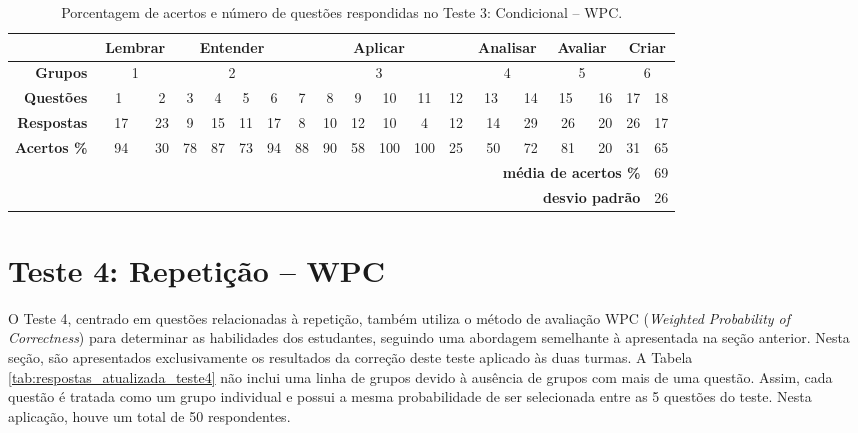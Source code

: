 \begin{table}[!ht]
    \centering
    \caption{Porcentagem de acertos e número de questões respondidas no Teste 3: Condicional -- WPC.}
    \label{tab:respostas_atualizada_teste3}
    \setlength{\tabcolsep}{4.2pt} %
    \begin{tabular}{|r|*{18}{c|}}
        \hline
        \multicolumn{1}{|l|}{} & \multicolumn{2}{c|}{\cellcolor{green!25}\textbf{Lembrar}} & \multicolumn{4}{c|}{\cellcolor{yellow!25}\textbf{Entender}} & \multicolumn{6}{|c|}{\cellcolor{red!25}\textbf{Aplicar}} & \multicolumn{2}{c|}{\cellcolor{blue!25}\textbf{Analisar}} & \multicolumn{2}{c|}{\cellcolor[HTML]{FFE599}\textbf{Avaliar}} & \multicolumn{2}{c|}{\cellcolor[HTML]{D5A6BD}\textbf{Criar}} \\ \hline
        \textbf{Grupos} & \multicolumn{2}{c|}{1} & \multicolumn{4}{c|}{2} & \multicolumn{6}{c|}{3} & \multicolumn{2}{c|}{4} & \multicolumn{2}{c|}{5} & \multicolumn{2}{c|}{6} \\\hline
        \rowcolor[HTML]{D9D9D9} 
        \textbf{Questões} & \ \ 1 \ \ & 2 & 3 & 4 & 5 & 6 & 7 & 8 & 9 & 10 & 11 & 12 & \ 13 \ & 14 & \ 15 \ & 16 & 17 & 18 \\
        \textbf{Respostas} & 17 & 23 & 9 & 15 & 11 & 17 & 8 & 10 & 12 & 10 & 4 & 12 & 14 & 29 & 26 & 20 & 26 & 17 \\ \rowcolor[HTML]{D9D9D9} 
        \textbf{Acertos \%} & 94 & 30 & 78 & 87 & 73 & 94 & 88 & 90 & 58 & 100 & 100 & 25 & 50 & 72 & 81 & 20 & 31 & 65 \\ \hline
        \multicolumn{13}{r}{} & \multicolumn{5}{r}{\cellcolor[HTML]{F9CB9C}\textbf{média de acertos \%}} & \multicolumn{1}{c}{\cellcolor[HTML]{F9CB9C}69} \\ 
        \multicolumn{13}{r}{} & \multicolumn{5}{r}{\cellcolor[HTML]{F9CB9C}\textbf{desvio padrão}} & \multicolumn{1}{c}{\cellcolor[HTML]{F9CB9C}26} \\ 
    \end{tabular}
\end{table}

\section{Teste 4: Repetição -- WPC}

O Teste 4, centrado em questões relacionadas à repetição, também utiliza o método de avaliação WPC (\textit{Weighted Probability of Correctness}) para determinar as habilidades dos estudantes, seguindo uma abordagem semelhante à apresentada na seção anterior. Nesta seção, são apresentados exclusivamente os resultados da correção deste teste aplicado às duas turmas. A Tabela \ref{tab:respostas_atualizada_teste4} não inclui uma linha de grupos devido à ausência de grupos com mais de uma questão. Assim, cada questão é tratada como um grupo individual e possui a mesma probabilidade de ser selecionada entre as 5 questões do teste. Nesta aplicação, houve um total de 50 respondentes.

